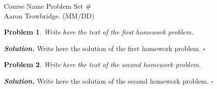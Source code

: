\documentclass[12pt]{article}
\newtheorem{problem}{Problem}
\newenvironment{solution}[1][\it{Solution}]{\textbf{#1. } }{$\square$}
\begin{document}
\noindent Course Name \hfill Problem Set \#\\
Aaron Trowbridge. (MM/DD)

\hrulefill


\begin{problem}
Write here the text of the first homework problem.
\end{problem}
\begin{solution}
	Write here the solution of the first homework problem.
\end{solution} 

\begin{problem}
Write here the text of the second homework problem.
\end{problem}
\begin{solution}
	Write here the solution of the second homework problem.
\end{solution}

 
\end{document}
